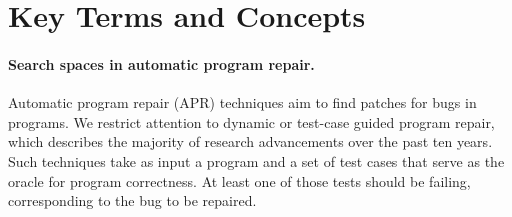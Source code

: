 \documentclass[sigconf, timestamp-false, anonymous=true]{acmart}
\begin{document}
\section{Key Terms and Concepts}
\label{sec:background}

\paragraph{Search spaces in automatic program repair.} Automatic program repair (APR) techniques aim to find patches for bugs in
programs.  We restrict attention to dynamic or test-case guided program repair,
which describes the majority of research advancements over the past ten years.
Such techniques take as input a program and a set of test cases that serve as
the oracle for program correctness.  At least one of those tests should be
failing, corresponding to the bug to be repaired.
\end{document}
